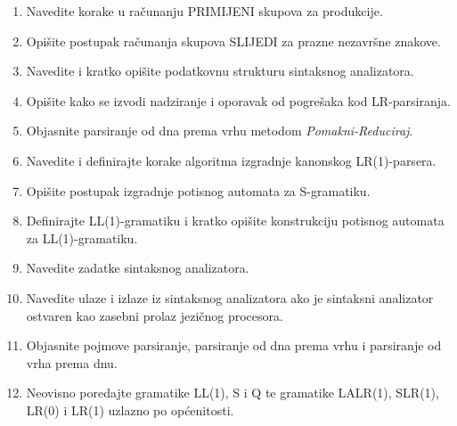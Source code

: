\documentclass[times, 12pt, utf8]{book}
\begin{document}
\begin{enumerate}[resume]
\item
Navedite korake u računanju PRIMIJENI skupova za produkcije. \cite[str.~107]{udzbenik}

\item
Opišite postupak računanja skupova SLIJEDI za prazne nezavršne znakove. \cite[str.~107]{udzbenik}

\item
Navedite i kratko opišite podatkovnu strukturu sintaksnog analizatora. \cite[str.~80]{udzbenik}

\item
Opišite kako se izvodi nadziranje i oporavak od pogrešaka kod LR-parsiranja. \cite[str.~153-154]{udzbenik}

\item
Objasnite parsiranje od dna prema vrhu metodom \emph{Pomakni-Reduciraj}. \cite[str.~126-130]{udzbenik}

\item
Navedite i definirajte korake algoritma izgradnje kanonskog LR(1)-parsera. \cite[str.~147-151]{udzbenik}

\item
Opišite postupak izgradnje potisnog automata za S-gramatiku. \cite[str.~87-88]{udzbenik}

\item
Definirajte LL(1)-gramatiku i kratko opišite konstrukciju potisnog automata za LL(1)-gramatiku. \cite[str.~95-99]{udzbenik}

\item
Navedite zadatke sintaksnog analizatora. \cite[str.~71]{udzbenik}

\item
Navedite ulaze i izlaze iz sintaksnog analizatora ako je sintaksni analizator ostvaren kao zasebni prolaz jezičnog procesora. \cite[str.~71]{udzbenik}

\item
Objasnite pojmove parsiranje, parsiranje od dna prema vrhu i parsiranje od vrha prema dnu. \cite[str.~84,113]{udzbenik}

\item
Neovisno poredajte gramatike LL(1), S i Q te gramatike LALR(1), SLR(1), LR(0) i LR(1) uzlazno po općenitosti. \cite[str.~71-154]{udzbenik}


\end{enumerate}
\end{document}
